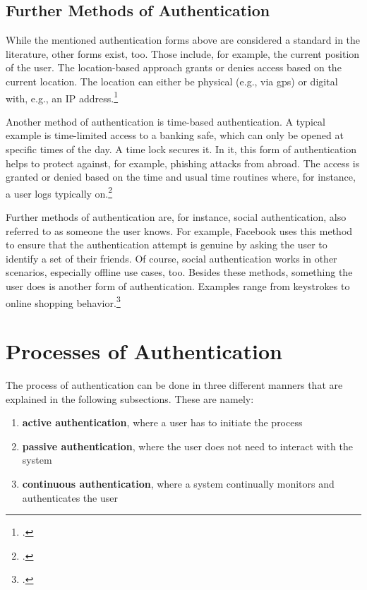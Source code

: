 \subsection{Further Methods of Authentication}

While the mentioned authentication forms above are considered a standard in the literature, other forms exist, too. Those include, for example, the current position of the user. The location-based approach grants or denies access based on the current location. The location can either be physical (e.g., via \gls{gps}) or digital with, e.g., an IP address.\footcites[See][]{6296127}[See][Chapter 13.9]{2308830}

Another method of authentication is time-based authentication. A typical example is time-limited access to a banking safe, which can only be opened at specific times of the day. A time lock secures it. In \gls{it}, this form of authentication helps to protect against, for example, phishing attacks from abroad. The access is granted or denied based on the time and usual time routines where, for instance, a user logs typically on.\footcite[See][191]{dasgupta2017multi}

Further methods of authentication are, for instance, social authentication, also referred to as \frqq someone the user knows\flqq. For example, Facebook uses this method to ensure that the authentication attempt is genuine by asking the user to identify a set of their friends. Of course, social authentication works in other scenarios, especially offline use cases, too. Besides these methods, \frqq something the user does\flqq{} is another form of authentication. Examples range from keystrokes to online shopping behavior.\footcites[See][]{Brainard2006}[See][278--279]{shostack2014threat}[See][]{10.1007/978-3-642-18178-8_9}[See][]{7460349}

\section{Processes of Authentication}

The process of authentication can be done in three different manners that are explained in the following subsections. These are namely:

\begin{enumerate}
	\item \textbf{active authentication}, where a user has to initiate the process
	\item \textbf{passive authentication}, where the user does not need to interact with the system
	\item \textbf{continuous authentication}, where a system continually monitors and authenticates the user
\end{enumerate}

